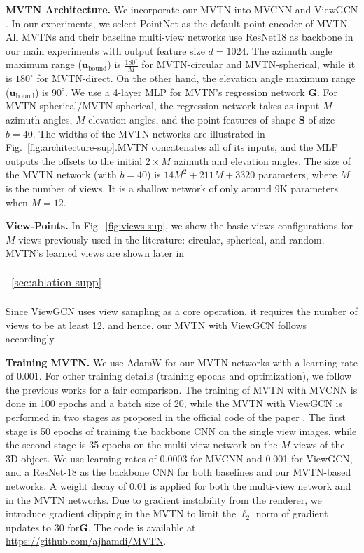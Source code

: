 \documentclass[10pt,twocolumn,letterpaper]{article}
\makeatletter
\newcommand{\figLabel}{Fig.~}
\newcommand{\mysection}[1]{\noindent\textbf{#1.}}
\newcommand{\specialcell}[2][c]{\begin{tabular}[#1]{@{}c@{}}#2\end{tabular}}
\makeatother
\begin{document}
\mysection{MVTN Architecture}
We incorporate our MVTN into MVCNN \cite{mvcnn} and ViewGCN \cite{mvviewgcn}. 
In our experiments, we select PointNet \cite{pointnet} as the default point encoder of MVTN.
All MVTNs and their baseline multi-view networks use ResNet18 \cite{resnet} as backbone in our main experiments with output feature size $d=1024$. The azimuth angle maximum range ($\mathbf{u}_{\text{bound}}$) is $\frac{180^\circ}{M}$  for MVTN-circular and MVTN-spherical, while it is $180^\circ$ for MVTN-direct. On the other hand, the elevation angle maximum range ($\mathbf{u}_{\text{bound}}$) is $90^\circ$.
We use a 4-layer MLP for MVTN's regression network $\mathbf{G}$. For MVTN-spherical/MVTN-spherical, the regression network takes as input $M$ azimuth angles, $M$ elevation angles, and the point features of shape $\mathbf{S}$ of size $b=40$. The widths of the MVTN networks are illustrated in \figLabel{\ref{fig:architecture-sup}}.MVTN concatenates all of its inputs, and the MLP outputs the offsets to the initial $2\times M$ azimuth and elevation angles. The size of the MVTN network (with $b=40$) is $14 M^2 + 211 M + 3320$ parameters, where $M$ is the number of views. It is a shallow network of only around 9K parameters when $M=12$.  

\mysection{View-Points}
In \figLabel{\ref{fig:views-sup}}, we show the basic views configurations for $M$ views previously used in the literature: circular, spherical, and random. MVTN's learned views are shown later in \specialcell{\ref{sec:ablation-supp}}
Since ViewGCN uses view sampling as a core operation, it requires the number of views to be at least 12, and hence, our MVTN with ViewGCN follows accordingly. 

\mysection{Training MVTN}
We use AdamW \cite{adamw} for our MVTN networks with a learning rate of 0.001. For other training details (\eg training epochs and optimization), we follow the previous works \cite{mvviewgcn,mvcnn} for a fair comparison. The training of MVTN with MVCNN is done in 100 epochs and a batch size of 20, while the MVTN with ViewGCN is performed in two stages as proposed in the official code of the paper \cite{mvviewgcn}. The first stage is 50 epochs of training the backbone CNN on the single view images, while the second stage is 35 epochs on the multi-view network on the $M$ views of the 3D object. We use learning rates of 0.0003 for MVCNN and 0.001 for ViewGCN, and a ResNet-18 \cite{resnet} as the backbone CNN for both baselines and our MVTN-based networks. A weight decay of 0.01 is applied for both the multi-view network and in the MVTN networks. Due to gradient instability from the renderer, we introduce gradient clipping in the MVTN to limit the $\ell_2$ norm of gradient updates to 30 for$\mathbf{G}$. The code is available at \url{https://github.com/ajhamdi/MVTN}.
\end{document}

